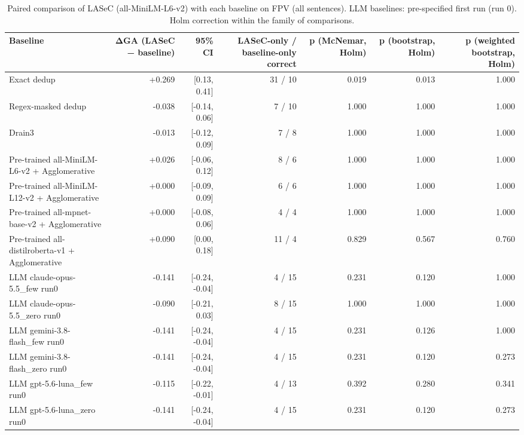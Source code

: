 \begin{table}[t]
\centering
\caption{Paired comparison of LASeC (all-MiniLM-L6-v2) with each baseline on FPV (all sentences). LLM baselines: pre-specified first run (run 0). Holm correction within the family of comparisons.}
\label{tab:significance_all}
\small
\begin{tabular}{lrrrrrr}
\toprule
Baseline & ΔGA (LASeC − baseline) & 95\% CI & LASeC-only / baseline-only correct & p (McNemar, Holm) & p (bootstrap, Holm) & p (weighted bootstrap, Holm) \\
\midrule
Exact dedup & +0.269 & [0.13, 0.41] & 31 / 10 & 0.019 & 0.013 & 1.000 \\
Regex-masked dedup & -0.038 & [-0.14, 0.06] & 7 / 10 & 1.000 & 1.000 & 1.000 \\
Drain3 & -0.013 & [-0.12, 0.09] & 7 / 8 & 1.000 & 1.000 & 1.000 \\
Pre-trained all-MiniLM-L6-v2 + Agglomerative & +0.026 & [-0.06, 0.12] & 8 / 6 & 1.000 & 1.000 & 1.000 \\
Pre-trained all-MiniLM-L12-v2 + Agglomerative & +0.000 & [-0.09, 0.09] & 6 / 6 & 1.000 & 1.000 & 1.000 \\
Pre-trained all-mpnet-base-v2 + Agglomerative & +0.000 & [-0.08, 0.06] & 4 / 4 & 1.000 & 1.000 & 1.000 \\
Pre-trained all-distilroberta-v1 + Agglomerative & +0.090 & [0.00, 0.18] & 11 / 4 & 0.829 & 0.567 & 0.760 \\
LLM claude-opus-5.5\_few run0 & -0.141 & [-0.24, -0.04] & 4 / 15 & 0.231 & 0.120 & 1.000 \\
LLM claude-opus-5.5\_zero run0 & -0.090 & [-0.21, 0.03] & 8 / 15 & 1.000 & 1.000 & 1.000 \\
LLM gemini-3.8-flash\_few run0 & -0.141 & [-0.24, -0.04] & 4 / 15 & 0.231 & 0.126 & 1.000 \\
LLM gemini-3.8-flash\_zero run0 & -0.141 & [-0.24, -0.04] & 4 / 15 & 0.231 & 0.120 & 0.273 \\
LLM gpt-5.6-luna\_few run0 & -0.115 & [-0.22, -0.01] & 4 / 13 & 0.392 & 0.280 & 0.341 \\
LLM gpt-5.6-luna\_zero run0 & -0.141 & [-0.24, -0.04] & 4 / 15 & 0.231 & 0.120 & 0.273 \\
\bottomrule
\end{tabular}
\end{table}